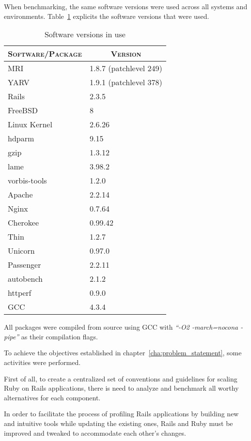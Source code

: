 When benchmarking, the same software versions were used across all systems and environments. Table~\ref{tab:software_versions} explicits the software versions that were used.
\begin{table}[ht]
  \centering
  \caption{Software versions in use}
  \label{tab:software_versions}
  
  \begin{tabular}{p{}|p{}}
    \multicolumn{1}{c|}{\textbf{\textsc{Software/Package}}} & \multicolumn{1}{c}{\textbf{\textsc{Version}}} \\ \hline
    
    MRI & 1.8.7 (patchlevel 249) \\ \hline
    YARV & 1.9.1 (patchlevel 378) \\ \hline
    Rails & 2.3.5 \\ \hline
    FreeBSD & 8 \\ \hline
    Linux Kernel & 2.6.26 \\ \hline
    hdparm & 9.15 \\ \hline
    gzip & 1.3.12 \\ \hline
    lame & 3.98.2 \\ \hline
    vorbis-tools & 1.2.0 \\ \hline
    Apache & 2.2.14 \\ \hline
    Nginx & 0.7.64 \\ \hline
    Cherokee & 0.99.42 \\ \hline
    Thin & 1.2.7 \\ \hline
    Unicorn & 0.97.0 \\ \hline
    Passenger & 2.2.11 \\ \hline
    autobench & 2.1.2 \\ \hline
    httperf & 0.9.0 \\ \hline
    GCC & 4.3.4
    
  \end{tabular}
\end{table}
All packages were compiled from source using GCC with \textit{``-O2 -march=nocona -pipe''} as their compilation flags.

To achieve the objectives established in chapter~\ref{cha:problem_statement}, some activities were performed.

First of all, to create a centralized set of conventions and guidelines for scaling Ruby on Rails applications, there is need to analyze and benchmark all worthy alternatives for each component.

In order to facilitate the process of profiling Rails applications by building new and intuitive tools while updating the existing ones, Rails and Ruby must be improved and tweaked to accommodate each other's changes.

